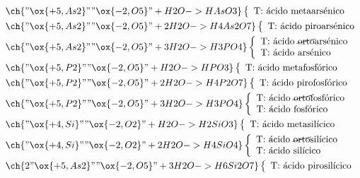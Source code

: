 \begin{align*}
	&\ch{"\ox{+5,As2}" "\ox{-2,O5}" + H2O -> HAsO3}\left\{\begin{array}{l}
		\text{T: ácido metaarsénico}
	\end{array}\right. \\
	&\ch{"\ox{+5,As2}" "\ox{-2,O5}" + 2 H2O -> H4As2O7}\left\{\begin{array}{l}
		\text{T: ácido piroarsénico}
	\end{array}\right. \\
	&\ch{"\ox{+5,As2}" "\ox{-2,O5}" + 3 H2O -> H3PO4}\left\{\begin{array}{l}
		\text{T: ácido \cancel{orto}arsénico} \\
		\text{T: ácido arsénico}
	\end{array}\right. \\
	&\ch{"\ox{+5,P2}" "\ox{-2,O5}" + H2O -> HPO3}\left\{\begin{array}{l}
		\text{T: ácido metafosfórico}
	\end{array}\right. \\
	&\ch{"\ox{+5,P2}" "\ox{-2,O5}" + 2 H2O -> H4P2O7}\left\{\begin{array}{l}
		\text{T: ácido pirofosfórico}
	\end{array}\right. \\
	&\ch{"\ox{+5,P2}" "\ox{-2,O5}" + 3 H2O -> H3PO4}\left\{\begin{array}{l}
		\text{T: ácido \cancel{orto}fosfórico} \\
		\text{T: ácido fosfórico}
	\end{array}\right. \\
	&\ch{"\ox{+4,Si}" "\ox{-2,O2}" + H2O -> H2SiO3}\left\{\begin{array}{l}
		\text{T: ácido metasilícico}
	\end{array}\right. \\
	&\ch{"\ox{+4,Si}" "\ox{-2,O2}" + 2 H2O -> H4SiO4}\left\{\begin{array}{l}
		\text{T: ácido \cancel{orto}silícico} \\
		\text{T: ácido silícico}
	\end{array}\right. \\
	&\ch{2 "\ox{+5,As2}" "\ox{-2,O5}" + 3 H2O -> H6Si2O7}\left\{\begin{array}{l}
		\text{T: ácido pirosilícico}
	\end{array}\right. \\
\end{align*}
